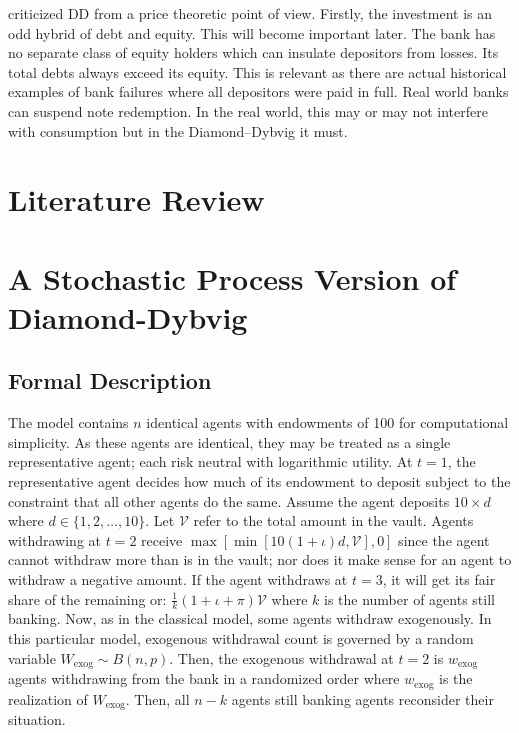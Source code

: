 \documentclass[12pt]{article}
\begin{document}
\begin{doublespace}
\citet{white1999theory} criticized DD from a price theoretic point of view.
Firstly, the investment is an odd hybrid of debt and equity. This will become important later.
The bank has no separate class of equity holders which can insulate depositors from losses. Its total debts always exceed its equity.
This is relevant as there are actual historical examples of bank failures where all depositors were paid in full.
Real world banks can suspend note redemption. In the real world, this may or may not interfere with consumption but in the Diamond--Dybvig it must.

\section{Literature Review}

\section{A Stochastic Process Version of Diamond-Dybvig}
\subsection{Formal Description}
The model contains $n$ identical agents with endowments of 100 for computational simplicity. As these agents are identical, they may be treated as a single representative agent; each risk neutral with logarithmic utility. At $t=1$, the representative agent decides how much of its endowment to deposit subject to the constraint that all other agents do the same. Assume the agent deposits $10\times d$ where $d \in \{1,2,\ldots,10\}$. Let $\mathcal{V}$ refer to the total amount in the vault. Agents withdrawing at $t=2$ receive $\max\left[\min\left[10(1+\iota)d,\mathcal{V}\right],0\right]$ since the agent cannot withdraw more than is in the vault; nor does it make sense for an agent to withdraw a negative amount.  If the agent withdraws at $t=3$, it will get its fair share of the remaining or: $\frac{1}{k}\left(1+\iota + \pi\right)\mathcal{V}$ where $k$ is the number of agents still banking. Now, as in the classical model, some agents withdraw exogenously. In this particular model, exogenous withdrawal count is governed by a random variable $W_{\mathrm{exog}} \sim B\left(n,p\right).$ Then, the exogenous withdrawal at $t=2$ is $w_{\mathrm{exog}}$ agents withdrawing from the bank in a randomized order where $w_{\mathrm{exog}}$ is the realization of $W_{\mathrm{exog}}$. Then, all $n-k$ agents still banking agents reconsider their situation. 



\end{doublespace}
\end{document}
